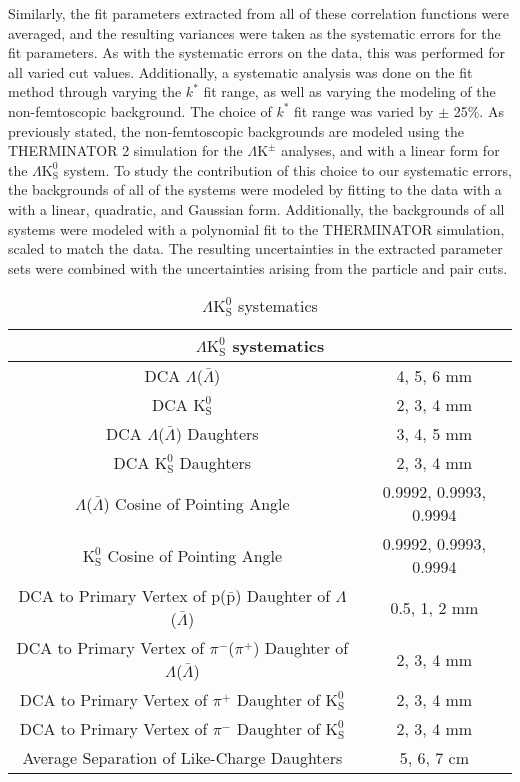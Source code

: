 \documentclass[ALICE,manyauthors]{cernphprep}
\newcommand{\kstar}{$k^{*}$\xspace}
\newcommand{\LamALam}{$\Lambda$($\bar{\Lambda}$)\xspace}
\newcommand{\Ks}{$\mathrm{K^{0}_{S}}$\xspace}
\newcommand{\LamKpm}{$\Lambda\mathrm{K^{\pm}}$\xspace}
\newcommand{\LamKs}{$\Lambda\mathrm{K^{0}_{S}}$\xspace}
\begin{document}
Similarly, the fit parameters extracted from all of these correlation functions were averaged, and the resulting variances were taken as the systematic errors for the fit parameters.
As with the systematic errors on the data, this was performed for all varied cut values.
Additionally, a systematic analysis was done on the fit method through varying the \kstar fit range, as well as varying the modeling of the non-femtoscopic background.
The choice of \kstar fit range was varied by $\pm$ 25\%. 
As previously stated, the non-femtoscopic backgrounds are modeled using the THERMINATOR 2 simulation for the \LamKpm analyses, and with a linear form for the \LamKs system.
To study the contribution of this choice to our systematic errors, the backgrounds of all of the systems were modeled by fitting to the data with a with a linear, quadratic, and Gaussian form.
Additionally, the backgrounds of all systems were modeled with a polynomial fit to the THERMINATOR simulation, scaled to match the data. 
The resulting uncertainties in the extracted parameter sets were combined with the uncertainties arising from the particle and pair cuts.


\begin{table}[htbp]
 \centering 
  \renewcommand{\arraystretch}{1.2}
  \begin{tabular}{c|c}
   \multicolumn{2}{c}{\LamKs systematics} \\
   \hline  
   DCA \LamALam & 4, 5, 6 mm \\
   \hline
   DCA \Ks & 2, 3, 4 mm \\
   \hline
   DCA \LamALam Daughters & 3, 4, 5 mm \\
   \hline
   DCA \Ks Daughters & 2, 3, 4 mm \\
   \hline
   \LamALam Cosine of Pointing Angle & 0.9992, 0.9993, 0.9994 \\
   \hline
   \Ks Cosine of Pointing Angle & 0.9992, 0.9993, 0.9994 \\
   \hline
   DCA to Primary Vertex of p($\bar{\mathrm{p}}$) Daughter of \LamALam & 0.5, 1, 2 mm \\
   \hline
   DCA to Primary Vertex of $\pi^{-}$($\pi^{+}$) Daughter of \LamALam &  2, 3, 4 mm \\ 
   \hline
   DCA to Primary Vertex of $\pi^{+}$ Daughter of \Ks & 2, 3, 4 mm \\
   \hline
   DCA to Primary Vertex of $\pi^{-}$ Daughter of \Ks & 2, 3, 4 mm \\
   \hline
   Average Separation of Like-Charge Daughters & 5, 6, 7 cm \\
   \hline
  \end{tabular}
 \caption{\LamKs systematics}
 \label{tab:LamK0sSystematics} 
\end{table}
\end{document}
